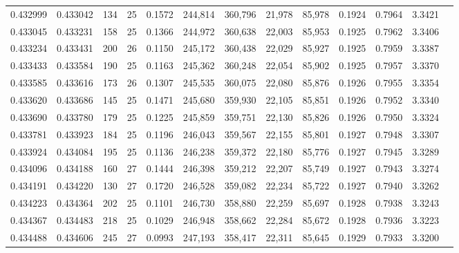 \begin{tabular}{rrrrrrrrrrrrr}
0.432999 & 0.433042 & 134 &  25 &                                     0.1572 & 244,814 & 360,796 &  21,978 &  85,978 & 0.1924 & 0.7964 & 3.3421 \\
0.433045 & 0.433231 & 158 &  25 &                                     0.1366 & 244,972 & 360,638 &  22,003 &  85,953 & 0.1925 & 0.7962 & 3.3406 \\
0.433234 & 0.433431 & 200 &  26 &                                     0.1150 & 245,172 & 360,438 &  22,029 &  85,927 & 0.1925 & 0.7959 & 3.3387 \\
0.433433 & 0.433584 & 190 &  25 &                                     0.1163 & 245,362 & 360,248 &  22,054 &  85,902 & 0.1925 & 0.7957 & 3.3370 \\
0.433585 & 0.433616 & 173 &  26 &                                     0.1307 & 245,535 & 360,075 &  22,080 &  85,876 & 0.1926 & 0.7955 & 3.3354 \\
0.433620 & 0.433686 & 145 &  25 &                                     0.1471 & 245,680 & 359,930 &  22,105 &  85,851 & 0.1926 & 0.7952 & 3.3340 \\
0.433690 & 0.433780 & 179 &  25 &                                     0.1225 & 245,859 & 359,751 &  22,130 &  85,826 & 0.1926 & 0.7950 & 3.3324 \\
0.433781 & 0.433923 & 184 &  25 &                                     0.1196 & 246,043 & 359,567 &  22,155 &  85,801 & 0.1927 & 0.7948 & 3.3307 \\
0.433924 & 0.434084 & 195 &  25 &                                     0.1136 & 246,238 & 359,372 &  22,180 &  85,776 & 0.1927 & 0.7945 & 3.3289 \\
0.434096 & 0.434188 & 160 &  27 &                                     0.1444 & 246,398 & 359,212 &  22,207 &  85,749 & 0.1927 & 0.7943 & 3.3274 \\
0.434191 & 0.434220 & 130 &  27 &                                     0.1720 & 246,528 & 359,082 &  22,234 &  85,722 & 0.1927 & 0.7940 & 3.3262 \\
0.434223 & 0.434364 & 202 &  25 &                                     0.1101 & 246,730 & 358,880 &  22,259 &  85,697 & 0.1928 & 0.7938 & 3.3243 \\
0.434367 & 0.434483 & 218 &  25 &                                     0.1029 & 246,948 & 358,662 &  22,284 &  85,672 & 0.1928 & 0.7936 & 3.3223 \\
0.434488 & 0.434606 & 245 &  27 &                                     0.0993 & 247,193 & 358,417 &  22,311 &  85,645 & 0.1929 & 0.7933 & 3.3200 \\

\end{tabular}
